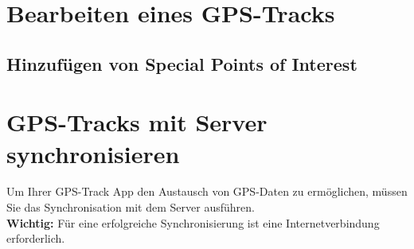 \documentclass{article}
\begin{document}
\newpage

\section{Bearbeiten eines GPS-Tracks}
\subsection{Hinzufügen von Special Points of Interest}
\newpage
\section{GPS-Tracks mit Server synchronisieren}
    Um Ihrer  GPS-Track App den Austausch von GPS-Daten zu ermöglichen, müssen Sie das Synchronisation mit dem Server ausführen.
    \\\textbf{Wichtig:} Für eine erfolgreiche Synchronisierung ist eine Internetverbindung erforderlich.
\end{document}
